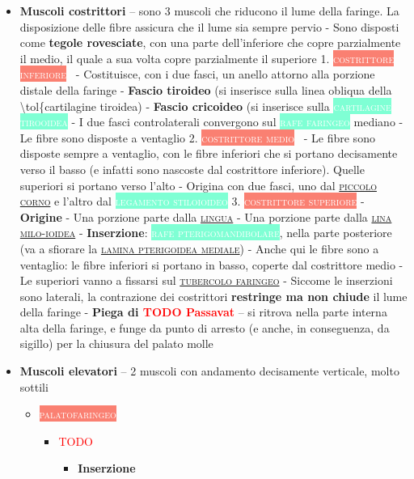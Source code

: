 \documentclass[italian,]{article}
\providecommand{\tightlist}{%
  \setlength{\itemsep}{0pt}\setlength{\parskip}{0pt}}
\newcommand{\mus}[1]{\colorbox{Salmon}{\textcolor{white}{\textsc{#1}}}}
\newcommand{\tol}[1]{\colorbox{Aquamarine}{\textcolor{white}{\textsc{#1}}}}
\renewcommand{\a}[1]{\underline{\textsc{#1}}}
\newcommand{\TODO}[1]{\textcolor{red}{\textsf{\footnotesize{TODO #1}}}} %
\begin{document}
\begin{itemize}
\tightlist
\item
  \textbf{Muscoli costrittori} -- sono 3 muscoli che riducono il lume
  della faringe. La disposizione delle fibre assicura che il lume sia
  sempre pervio - Sono disposti come \textbf{tegole rovesciate}, con una
  parte dell'inferiore che copre parzialmente il medio, il quale a sua
  volta copre parzialmente il superiore 1. \mus{costrittore inferiore}~
  - Costituisce, con i due fasci, un anello attorno alla porzione
  distale della faringe - \textbf{Fascio tiroideo} (si inserisce sulla
  linea obliqua della \textbackslash{}tol\{cartilagine tiroidea) -
  \textbf{Fascio cricoideo} (si inserisce sulla
  \tol{cartilagine tirooidea} - I due fasci controlaterali convergono
  sul \tol{rafe faringeo} mediano - Le fibre sono disposte a ventaglio
  2. \mus{costrittore medio}~ - Le fibre sono disposte sempre a
  ventaglio, con le fibre inferiori che si portano decisamente verso il
  basso (e infatti sono nascoste dal costrittore inferiore). Quelle
  superiori si portano verso l'alto - Origina con due fasci, uno dal
  \a{piccolo corno} e l'altro dal \tol{legamento stiloioideo} 3.
  \mus{costrittore superiore} - \textbf{Origine} - Una porzione parte
  dalla \a{lingua} - Una porzione parte dalla \a{lina milo-ioidea} -
  \textbf{Inserzione}: \tol{rafe pterigomandibolare}, nella parte
  posteriore (va a sfiorare la \a{lamina pterigoidea mediale}) - Anche
  qui le fibre sono a ventaglio: le fibre inferiori si portano in basso,
  coperte dal costrittore medio - Le superiori vanno a fissarsi sul
  \a{tubercolo faringeo} - Siccome le inserzioni sono laterali, la
  contrazione dei costrittori \textbf{restringe ma non chiude} il lume
  della faringe - \textbf{Piega di \TODO{Passavat}} -- si ritrova nella
  parte interna alta della faringe, e funge da punto di arresto (e
  anche, in conseguenza, da sigillo) per la chiusura del palato molle
\item
  \textbf{Muscoli elevatori} -- 2 muscoli con andamento decisamente
  verticale, molto sottili

  \begin{itemize}
  \item
    \mus{palatofaringeo}

    \begin{itemize}
    \item
      \TODO{}

      \begin{itemize}
      \tightlist
      \item
        \textbf{Inserzione}


\end{itemize}
\end{itemize}
\end{itemize}
\end{itemize}
\end{document}
